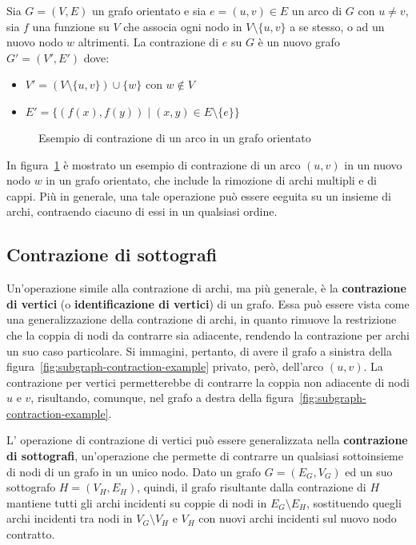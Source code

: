 \begin{definition}
Sia $G = (V, E)$ un grafo orientato e sia $e = (u, v) \in E$ un arco di $G$ con $u \neq v$,
sia $f$ una funzione su $V$ che associa ogni nodo in $V \setminus \{u, v\}$ a se stesso, o ad un nuovo nodo $w$
altrimenti. \newline
La contrazione di $e$ su $G$ \`e un nuovo grafo $G' = (V', E')$ dove:
\begin{itemize}
    \item $V' = (V \setminus \{u, v\}) \cup \{w\}$ con $w \notin V$
    \item $E' = \{(f(x), f(y)) \mid (x, y) \in E \setminus \{e\}\}$
\end{itemize}
\end{definition}

\begin{figure}[h]
    \centering
    
    \caption{Esempio di contrazione di un arco in un grafo orientato}
    \label{fig:edge-contraction-example}
\end{figure}

In figura~\ref{fig:edge-contraction-example} \`e mostrato un esempio di contrazione di un arco $(u, v)$ in un nuovo
nodo $w$ in un grafo orientato, che include la rimozione di archi multipli e di cappi.
Pi\`u in generale, una tale operazione pu\`o essere eeguita su un insieme di archi, contraendo ciacuno di essi in
un qualsiasi ordine.

\subsection{Contrazione di sottografi}\label{subsec:contrazione-di-sottografi}
Un'operazione simile alla contrazione di archi, ma pi\`u generale, \`e la \textbf{contrazione di vertici}
(o \textbf{identificazione di vertici}) di un grafo.
Essa pu\`o essere vista come una generalizzazione della contrazione di archi, in quanto rimuove la restrizione che
la coppia di nodi da contrarre sia adiacente, rendendo la contrazione per archi un suo caso particolare.
Si immagini, pertanto, di avere il grafo a sinistra della figura~\ref{fig:subgraph-contraction-example} privato,
per\`o, dell'arco $(u, v)$.
La contrazione per vertici permetterebbe di contrarre la coppia non adiacente di nodi $u$ e $v$, risultando,
comunque, nel grafo a destra della figura~\ref{fig:subgraph-contraction-example}. \newline

L' operazione di contrazione di vertici pu\`o essere generalizzata nella \textbf{contrazione di sottografi},
un'operazione che permette di contrarre un qualsiasi sottoinsieme di nodi di un grafo in un unico nodo.
Dato un grafo $G = (E_G, V_G)$ ed un suo sottografo $H = (V_H, E_H)$, quindi, il grafo risultante dalla contrazione
di $H$ mantiene tutti gli archi incidenti su coppie di nodi in $E_G \setminus E_H$, sostituendo
quegli archi incidenti tra nodi in $V_G \setminus V_H$ e $V_H$ con nuovi archi incidenti sul nuovo nodo contratto.

